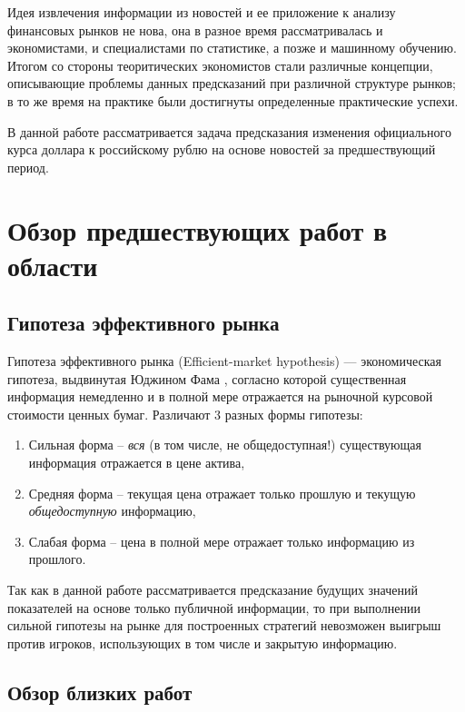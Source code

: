 \documentclass[pdftex,ptm,12pt,a4paper]{report}
\begin{document}
Идея извлечения информации из новостей и ее приложение к анализу финансовых рынков не нова, она
в разное время рассматривалась и экономистами, и специалистами по статистике, а позже и машинному обучению.
Итогом со стороны теоритических экономистов стали различные концепции,
описывающие проблемы данных предсказаний при различной структуре рынков; в то же время на практике
были достигнуты определенные практические успехи.

В данной работе рассматривается задача предсказания изменения официального курса доллара к российскому рублю
на основе новостей за предшествующий период.

\chapter{Обзор предшествующих работ в области}

\iffalse

\section{Гипотеза эффективного рынка}

Гипотеза эффективного рынка (Efficient-market hypothesis) --- экономическая гипотеза, выдвинутая Юджином Фама \cite{EFH}, согласно которой существенная информация немедленно и в полной мере отражается на рыночной курсовой стоимости ценных бумаг. Различают 3 разных формы гипотезы:

\begin{enumerate}
\item Сильная форма -- \textit{вся} (в том числе, не общедоступная!) существующая информация отражается в цене актива,
\item Средняя форма -- текущая цена отражает только прошлую и текущую \textit{общедоступную} информацию,
\item Слабая форма -- цена в полной мере отражает только информацию из прошлого.
\end{enumerate}

Так как в данной работе рассматривается предсказание будущих значений показателей на основе только публичной информации,
то при выполнении сильной гипотезы на рынке для построенных стратегий невозможен выигрыш против игроков, использующих в том
числе и закрытую информацию.

\section{Обзор близких работ}
\end{document}
